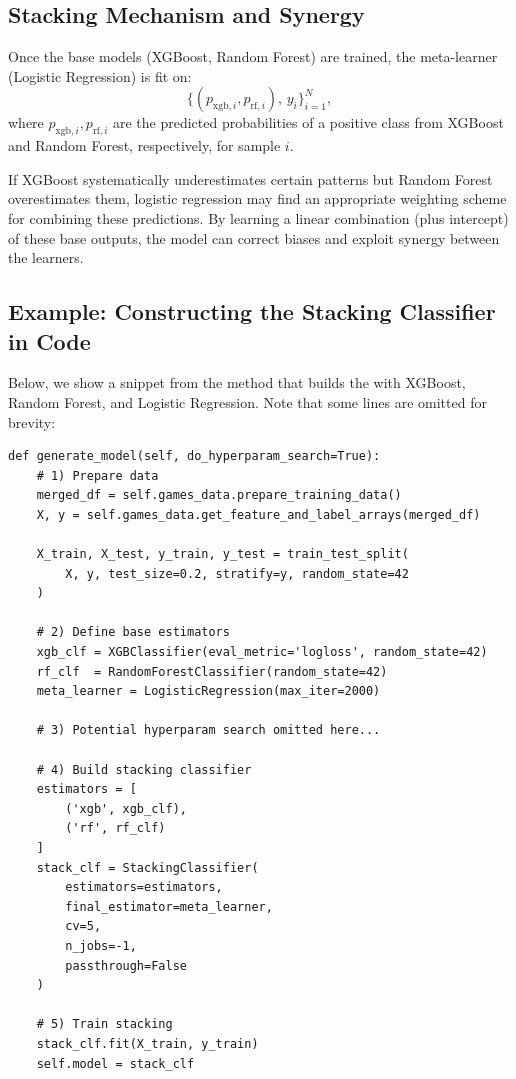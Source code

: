 \documentclass[12pt]{article}
\begin{document}
\subsection{Stacking Mechanism and Synergy}
Once the base models (XGBoost, Random Forest) are trained, the meta-learner (Logistic Regression) is fit on:
\[
\big\{ (p_{\text{xgb},i}, p_{\text{rf},i}),\, y_i \big\}_{i=1}^N,
\]
where \(p_{\text{xgb},i}, p_{\text{rf},i}\) are the predicted probabilities of a positive class from XGBoost and Random Forest, respectively, for sample \(i\).

If XGBoost systematically underestimates certain patterns but Random Forest overestimates them, logistic regression may find an appropriate weighting scheme for combining these predictions. By learning a linear combination (plus intercept) of these base outputs, the model can correct biases and exploit synergy between the learners.

\subsection{Example: Constructing the Stacking Classifier in Code}
Below, we show a snippet from the  method that builds the  with XGBoost, Random Forest, and Logistic Regression. Note that some lines are omitted for brevity:

\begin{verbatim}
def generate_model(self, do_hyperparam_search=True):
    # 1) Prepare data
    merged_df = self.games_data.prepare_training_data()
    X, y = self.games_data.get_feature_and_label_arrays(merged_df)

    X_train, X_test, y_train, y_test = train_test_split(
        X, y, test_size=0.2, stratify=y, random_state=42
    )

    # 2) Define base estimators
    xgb_clf = XGBClassifier(eval_metric='logloss', random_state=42)
    rf_clf  = RandomForestClassifier(random_state=42)
    meta_learner = LogisticRegression(max_iter=2000)

    # 3) Potential hyperparam search omitted here...
    
    # 4) Build stacking classifier
    estimators = [
        ('xgb', xgb_clf),
        ('rf', rf_clf)
    ]
    stack_clf = StackingClassifier(
        estimators=estimators,
        final_estimator=meta_learner,
        cv=5,
        n_jobs=-1,
        passthrough=False
    )

    # 5) Train stacking
    stack_clf.fit(X_train, y_train)
    self.model = stack_clf
\end{verbatim}
\end{document}
